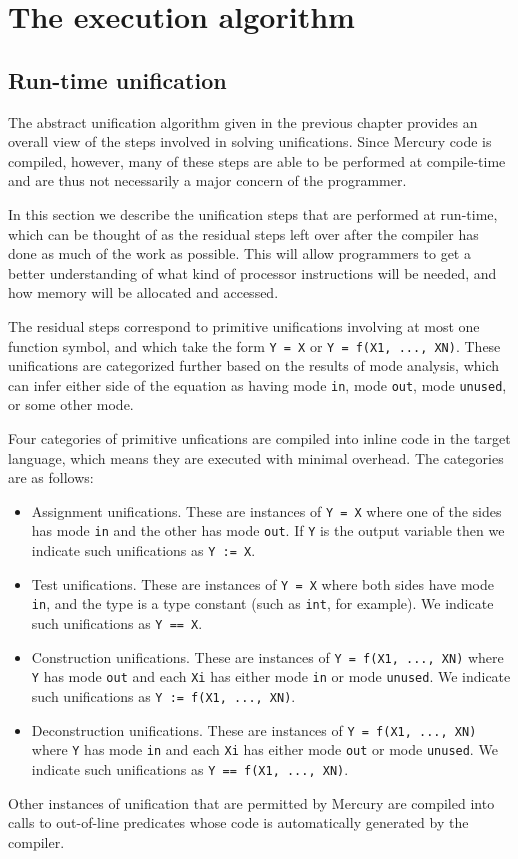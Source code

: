\chapter{The execution algorithm}
\label{sec:exec}

\section{Run-time unification}
\label{sec:rt-unify}

The abstract unification algorithm
given in the previous chapter
provides an overall view of the steps involved in
solving unifications.
Since Mercury code is compiled, however,
many of these steps are able to be performed at compile-time
and are thus not necessarily a major concern of the programmer.

In this section we describe the unification steps
that are performed at run-time,
which can be thought of as the residual steps
left over after the compiler has done
as much of the work as possible.
This will allow programmers to get a better understanding of
what kind of processor instructions will be needed,
and how memory will be allocated and accessed.

The residual steps correspond to primitive unifications
involving at most one function symbol,
and which take the form \texttt{Y = X}
or \texttt{Y = f(X1, ..., XN)}.
These unifications are categorized further
based on the results of mode analysis,
which can infer either side of the equation
as having mode \texttt{in}, mode \texttt{out}, mode \texttt{unused},
or some other mode.

Four categories of primitive unfications
are compiled into inline code in the target language,
which means they are executed with minimal overhead.
The categories are as follows:
\begin{itemize}
\item
Assignment unifications\label{gi:assignment}.
These are instances of \texttt{Y = X}
where one of the sides has mode \texttt{in}
and the other has mode \texttt{out}.
If \texttt{Y} is the output variable
then we indicate such unifications as
\texttt{Y := X}.
\item
Test unifications\label{gi:test}.
These are instances of \texttt{Y = X}
where both sides have mode \texttt{in},
and the type is a type constant
(such as \texttt{int}, for example).
We indicate such unifications as
\texttt{Y == X}.
\item
Construction unifications\label{gi:construction}.
These are instances of \texttt{Y = f(X1, ..., XN)}
where \texttt{Y} has mode \texttt{out}
and each \texttt{Xi} has either mode \texttt{in}
or mode \texttt{unused}.
We indicate such unifications as
\texttt{Y := f(X1, ..., XN)}.
\item
Deconstruction unifications\label{gi:deconstruction}.
These are instances of \texttt{Y = f(X1, ..., XN)}
where \texttt{Y} has mode \texttt{in}
and each \texttt{Xi} has either mode \texttt{out}
or mode \texttt{unused}.
We indicate such unifications as
\texttt{Y == f(X1, ..., XN)}.
\end{itemize}
Other instances of unification
that are permitted by Mercury
are compiled into calls to
out-of-line predicates whose code is
automatically generated by the compiler.

